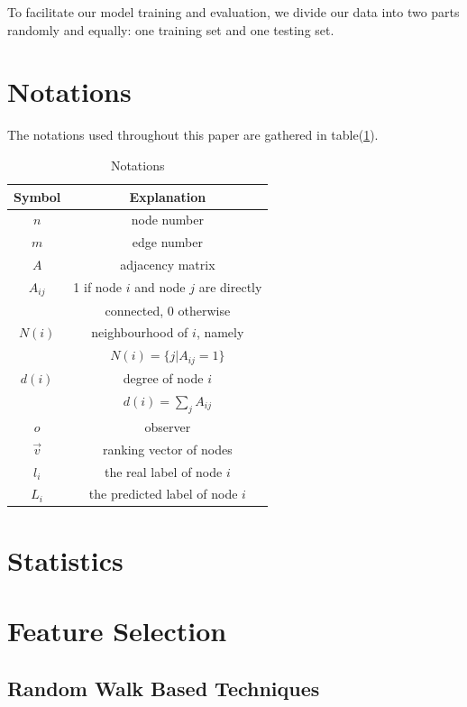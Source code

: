 \documentclass[11pt,a4paper]{article}
\begin{document}
To facilitate our model training and evaluation, 
we divide our data into two parts randomly and equally: 
one training set and one testing set. 

\section{Notations}

The notations used throughout this paper are gathered 
in table(\ref{tbl:notation}). 

\begin{table}[htb]
	\centering
	\caption{Notations}
	\label{tbl:notation}
	\begin{tabular}{c|c}
	\hline
	Symbol & Explanation \\
	\hline
	$n$ & node number \\
	$m$ & edge number \\
	$A$ & adjacency matrix \\
	$A_{ij}$ & 1 if node $i$ and node $j$ are directly \\
	& connected, 0 otherwise\\
	$N(i)$ & neighbourhood of $i$, namely \\
	& $N(i) = \{j | A_{ij} = 1 \}$ \\
	$d(i)$ & degree of node $i$ \\
	& $d(i) = \sum_{j}{A_{ij}}$ \\
	$o$ & observer \\
	$\overrightarrow{v}$ & ranking vector of nodes \\
	$l_i$ & the real label of node $i$ \\
	$L_i$ & the predicted label of node $i$ \\
	\hline
	\end{tabular}
\end{table}


\section{Statistics}

\section{Feature Selection}

\subsection{Random Walk Based Techniques}
\label{sec:prox_pr}
\end{document}
